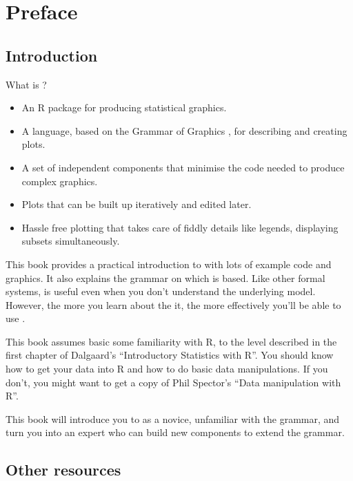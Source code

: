 

\chapter{Preface}

\section{Introduction}

What is \ggplot? 

\begin{itemize}
  \item An R package for producing statistical graphics.  

  \item A language, based on the Grammar of Graphics \citep{wilkinson:2006},  for describing and creating plots. 

  \item A set of independent components that minimise the code needed to produce complex graphics.

  \item Plots that can be built up iteratively and edited later.

  \item Hassle free plotting that takes care of fiddly details like legends, displaying subsets simultaneously.

\end{itemize} 

This book provides a practical introduction to \ggplot with lots of example code and graphics. It also explains the grammar on which \ggplot is based. Like other formal systems, \ggplot is useful even when you don't understand the underlying model. However, the more you learn about the it, the more effectively you'll be able to use \ggplot. 

This book assumes basic some familiarity with R, to the level described in the first chapter of Dalgaard’s ``Introductory Statistics with R''. You should know how to get your data into R and how to do basic data manipulations.  If you don't, you might want to get a copy of Phil Spector's ``Data manipulation with R''.  

This book will introduce you to \ggplot as a novice, unfamiliar with the grammar, and turn you into an expert who can build new components to extend the grammar.

\section{Other resources}
\label{sec:other_resources}

